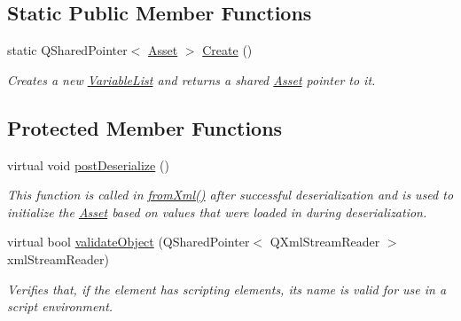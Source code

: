 \subsection*{Static Public Member Functions}
\begin{DoxyCompactItemize}
\item 
\hypertarget{class_picto_1_1_variable_list_a4f2e97239afcee33efe1eafaac5d2f97}{static Q\-Shared\-Pointer$<$ \hyperlink{class_picto_1_1_asset}{Asset} $>$ \hyperlink{class_picto_1_1_variable_list_a4f2e97239afcee33efe1eafaac5d2f97}{Create} ()}\label{class_picto_1_1_variable_list_a4f2e97239afcee33efe1eafaac5d2f97}

\begin{DoxyCompactList}\small\item\em Creates a new \hyperlink{class_picto_1_1_variable_list}{Variable\-List} and returns a shared \hyperlink{class_picto_1_1_asset}{Asset} pointer to it. \end{DoxyCompactList}\end{DoxyCompactItemize}
\subsection*{Protected Member Functions}
\begin{DoxyCompactItemize}
\item 
virtual void \hyperlink{class_picto_1_1_variable_list_affb7de311b36cc25414b6386ac401467}{post\-Deserialize} ()
\begin{DoxyCompactList}\small\item\em This function is called in \hyperlink{class_picto_1_1_asset_a8bed4da09ecb1c07ce0dab313a9aba67}{from\-Xml()} after successful deserialization and is used to initialize the \hyperlink{class_picto_1_1_asset}{Asset} based on values that were loaded in during deserialization. \end{DoxyCompactList}\item 
\hypertarget{class_picto_1_1_variable_list_ac5f0fa81d75a474c4ac974fbe88f9500}{virtual bool \hyperlink{class_picto_1_1_variable_list_ac5f0fa81d75a474c4ac974fbe88f9500}{validate\-Object} (Q\-Shared\-Pointer$<$ Q\-Xml\-Stream\-Reader $>$ xml\-Stream\-Reader)}\label{class_picto_1_1_variable_list_ac5f0fa81d75a474c4ac974fbe88f9500}

\begin{DoxyCompactList}\small\item\em Verifies that, if the element has scripting elements, its name is valid for use in a script environment. \end{DoxyCompactList}\end{DoxyCompactItemize}
